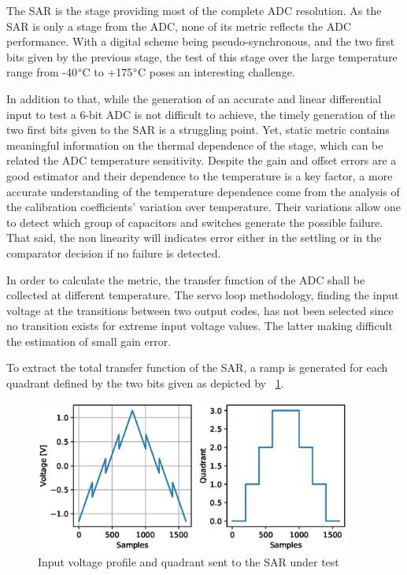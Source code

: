 The SAR is the stage providing most of the complete ADC resolution. As the SAR is only a stage from the ADC, none of its metric reflects the ADC performance. With a digital scheme being pseudo-synchronous, and the two first bits given by the previous stage, the test of this stage over the large temperature range from -40\(\degree \)C to +175\(\degree \)C poses an interesting challenge.

In addition to that, while the generation of an accurate and linear differential input to test a 6-bit ADC is not difficult to achieve, the timely generation of the two first bits given to the SAR is a struggling point. Yet, static metric contains meaningful information on the thermal dependence of the stage, which can be related the ADC temperature sensitivity. Despite the gain and offset errors are a good estimator and their dependence to the temperature is a key factor, a more accurate understanding of the temperature dependence come from the analysis of the calibration coefficients' variation over temperature. Their variations allow one to detect which group of capacitors and switches generate the possible failure. That said, the non linearity will indicates error either in the settling or in the comparator decision if no failure is detected.

In order to calculate the metric, the transfer function of the ADC shall be collected at different temperature. The servo loop methodology, finding the input voltage at the transitions between two output codes, has not been selected since no transition exists for extreme input voltage values. The latter making difficult the estimation of small gain error.

To extract the total transfer function of the SAR, a ramp is generated for each quadrant defined by the two bits given as depicted by \figurename~\ref{fig:sar-test-input}. 

\begin{figure}[htp]
    \centering
    \includegraphics[height=5cm]{Chapter5/Figs/sar_test/sar-test-input.eps}
    \caption{Input voltage profile and quadrant sent to the SAR under test}
    \label{fig:sar-test-input}
\end{figure}

